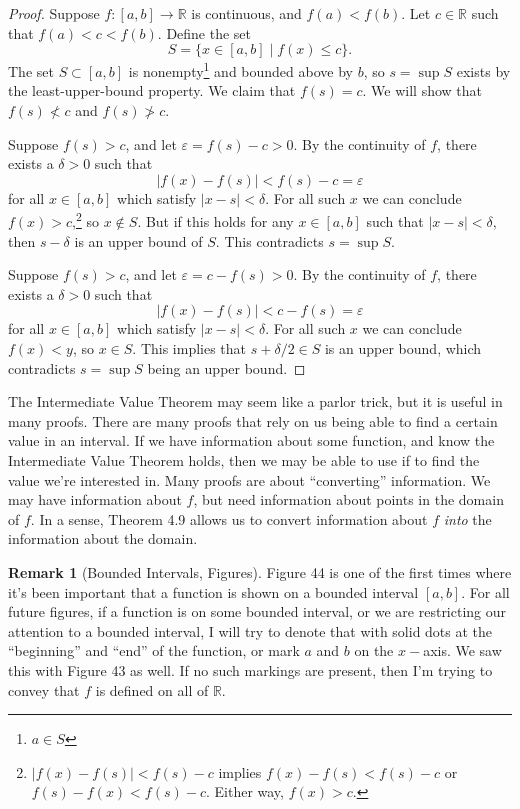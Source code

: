 \documentclass{article}
\newcommand{\R}{\mathbb{R}}
\theoremstyle{definition}
\newtheorem{remark}{Remark}[section]
\begin{document}
	\begin{proof}
		Suppose $ f:[a,b]\to\R $ is continuous, and $ f(a)<f(b) $. Let $ c\in\R $ such that $f(a)<c<f(b)$. Define the set $$S=\{x\in[a,b]\mid f(x)\le c\}. $$ The set $ S\subset[a,b] $ is nonempty\footnote{$ a\in S $} and bounded above by $ b $, so $ s=\sup S $ exists by the least-upper-bound property. We claim that $ f(s)=c $. We will show that $ f(s)\not<c $ and $ f(s)\not>c $.
		
		Suppose $ f(s)>c $, and let $ \varepsilon=f(s)-c>0 $. By the continuity of $ f $, there exists a $ \delta>0 $ such that $$ |f(x)-f(s)|<f(s)-c=\varepsilon $$ for all $ x\in[a,b] $ which satisfy $ |x-s|<\delta $. For all such $ x $ we can conclude $ f(x)>c $,\footnote{$ |f(x)-f(s)|<f(s)-c$ implies $ f(x)-f(s)<f(s)-c $ or $ f(s)-f(x)<f(s)-c $. Either way, $ f(x)>c $.} so $ x\notin S $. But if this holds for any $x\in[a,b] $ such that $ |x-s|<\delta $, then $ s-\delta $ is an upper bound of $ S $. This contradicts $ s=\sup S $.
		
		Suppose $ f(s)>c $, and let $ \varepsilon=c-f(s)>0 $. By the continuity of $ f $, there exists a $ \delta>0 $ such that $$ |f(x)-f(s)|<c-f(s)=\varepsilon $$ for all $ x\in[a,b] $ which satisfy $ |x-s|<\delta $. For all such $ x $ we can conclude $ f(x)<y $, so $ x\in S $. This implies that $ s+\delta/2\in S $ is an upper bound, which contradicts $ s=\sup S $ being an upper bound. 
	\end{proof}
	The Intermediate Value Theorem may seem like a parlor trick, but it is useful in many proofs. There are many proofs that rely on us being able to find a certain value in an interval. If we have information about some function, and know the Intermediate Value Theorem holds, then we may be able to use if to find the value we're interested in. Many proofs are about ``converting'' information. We may have information about $ f $, but need information about points in the domain of $ f $. In a sense, Theorem 4.9 allows us to convert information about $ f $ \textit{into} the information about the domain.  
	\begin{remark}[Bounded Intervals, Figures]
		Figure 44 is one of the first times where it's been important that a function is shown on a bounded interval $ [a,b] $. For all future figures, if a function is on some bounded interval, or we are restricting our attention to a bounded interval, I will try to denote that with solid dots at the ``beginning'' and ``end'' of the function, or mark $ a $ and $ b $ on the $ x -$axis. We saw this with Figure 43 as well. If no such markings are present, then I'm trying to convey that $ f $ is defined on all of $ \R $. 
	\end{remark}
\end{document}
